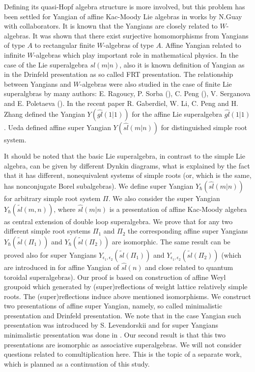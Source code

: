 \documentclass[english]{elsarticle}
\numberwithin{equation}{section}
\begin{document}
Defining its quasi-Hopf algebra structure is more involved, but this problem has been settled for Yangian of  affine Kac-Moody Lie algebras in works by N.Guay with collaborators. It is known that the Yangians are closely related to $W$-algebras. It was shown  that there exist surjective homomorphisms from Yangians of type $A$ to rectangular finite $W$-algebras of type $A$. Affine Yangian related to infinite $W$-algebras which play important role in mathematical physics.
In the case of the Lie superalgebra $sl(m|n)$, also it is known definition of Yangian as in the Drinfeld presentation as so called FRT presentation. The relationship between Yangians and $W$-algebras were also studied in the case of finite Lie superalgbras by many authors: E. Ragoucy, P. Sorba (\cite{RS}),    C. Peng (\cite{Peng}), V. Serganova and E. Poletaeva (\cite{PS}). In the recent paper R. Gaberdiel, W. Li, C. Peng and H. Zhang \cite{SuSy} defined the Yangian $Y(\hat{gl}(1|1))$ for the affine Lie superalgebra $\hat{gl}(1|1)$. Ueda defined affine super Yangian $Y(\hat{sl}(m|n))$ for distinguished simple root system.

It should be noted that the basic Lie superalgebra, in contrast to the simple Lie algebra, can be given by different Dynkin diagrams, what is explained by the fact that it has different, nonequivalent systems of simple roots (or, which is the same, has nonconjugate Borel subalgebras). We define super Yangian $Y_{\hbar}(\hat{sl}(m|n))$ for arbitrary simple root system $\Pi$. We also consider the super Yangian $Y_{\hbar}(\tilde{sl}(m,n))$, where $\hat{sl}(m|n)$ is a presentation of affine Kac-Moody algebra as central extension of double loop superalgebra. We prove that for any two different simple root systems $\Pi_1$ and $\Pi_2$ the corresponding affine super Yangians $Y_{\hbar}(\tilde{sl}(\Pi_1))$ and $Y_{\hbar}(\tilde{sl}(\Pi_2))$ are isomorphic. The same result can be proved also for super Yangians $Y_{\epsilon_1, \epsilon_2}(\tilde{sl}(\Pi_1))$ and $Y_{\epsilon_1, \epsilon_2}(\tilde{sl}(\Pi_2))$  (which are introduced in \cite{Guaywork1} for affine Yangian of $\hat{sl}(n)$ and close related to quantum toroidal superalgebras).  Our proof is based on construction of affine Weyl groupoid which generated by (super)reflections of weight lattice relatively simple roots. The (super)reflections induce above mentioned isomorphisms.  We construct two presentations of affine  super Yangian, namely, so called minimalistic presentation  and Drinfeld presentation. We note that in the case Yangian such presentation was introduced by S. Levendorskii \cite{Lev} and for super Yangians minimalistic presentation was done in \cite{St}.  Our second result is that this two presentations are isomorphic as associative superalgebras. We will not consider questions related to comultiplication here. This is the topic of a separate work, which is planned as a continuation of this study.
\end{document}
